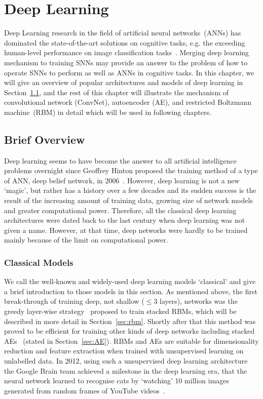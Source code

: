 \chapter{Deep Learning}
\label{cha:dnn}
Deep Learning research in the field of artificial neural networks~(ANNs) has dominated the state-of-the-art solutions on cognitive tasks, e.g. the exceeding human-level performance on image classification tasks~\cite{he2015delving}.
Merging deep learning mechanism to training SNNs may provide an answer to the problem of how to operate SNNs to perform as well as ANNs in cognitive tasks. 
In this chapter, we will give an overview of popular architectures and models of deep learning in Section~\ref{sec:dl_history}, and the rest of this chapter will illustrate the mechanism of convolutional network (ConvNet), autoencoder (AE), and restricted Boltzmann machine~(RBM) in detail which will be used in following chapters.

\section{Brief Overview}
\label{sec:dl_history}
Deep learning seems to have become the answer to all artificial intelligence problems overnight since Geoffrey Hinton proposed the training method of a type of ANN, deep belief network, in 2006~\cite{hinton2006fast}.
However, deep learning is not a new `magic', but rather has a history over a few decades and its sudden success is the result of the increasing amount of training data, growing size of network models and greater computational power.
Therefore, all the classical deep learning architectures were dated back to the last century when deep learning was not given a name.
However, at that time, deep networks were hardly to be trained mainly because of the limit on computational power.


\subsection{Classical Models}
We call the well-known and widely-used deep learning models `classical' and give a brief introduction to those models in this section. 
As mentioned above, the first break-through of training deep, not shallow ($\le 3$ layers), networks was the greedy layer-wise strategy~\cite{hinton2006fast} proposed to train stacked RBMs, which will be described in more detail in Section~\ref{sec:rbm}.
Shortly after that this method was proved to be efficient for training other kinds of deep networks including stacked AEs~\cite{bengio2007greedy} (stated in Section~\ref{sec:AE}).
RBMs and AEs are suitable for dimensionality reduction and feature extraction when trained with unsupervised learning on unlabelled data.
In 2012, using such a unsupervised deep learning architecture the Google Brain team achieved a milestone in the deep learning era, that the neural network learned to recognise cats by `watching' 10 million images generated from random frames of YouTube videos~\cite{le2013building}.

